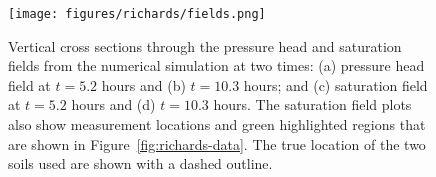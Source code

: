 \begin{figure}[!htbp]
\begin{center}
\texttt{[image: figures/richards/fields.png]}
\end{center}
\caption{Vertical cross sections through the pressure head and saturation fields from the numerical simulation at two times: (a) pressure head field at $t=5.2$ hours and (b) $t=10.3$ hours; and (c) saturation field at $t=5.2$ hours and (d) $t=10.3$ hours. The saturation field plots also show measurement locations and green highlighted regions that are shown in Figure~\ref{fig:richards-data}. The true location of the two soils used are shown with a dashed outline.}
\label{fig:richards-fields}
\end{figure}

